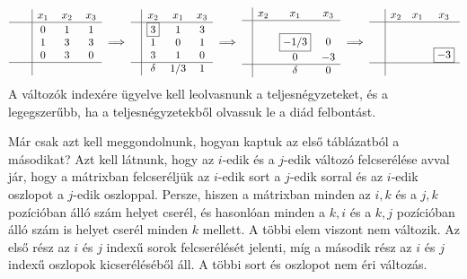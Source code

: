 \documentclass[a4paper, showtrims]{memoir}
\theoremstyle{plain}
\theoremstyle{remark}
\theoremstyle{definition}
\begin{document}
\[
\begin{array}{c|ccc}
     & x_1       & x_2 & x_3 \\
     \hline
     \phantom{\boxed{3}} & 0 & 1   & 1   \\
     & 1 & 3   & 3   \\
     & 0 & 3   & 0   \\
    \hline
    & \phantom{\delta}     &\phantom{1/3}    &\phantom{1}
\end{array}
\implies
\begin{array}{c|ccc}
     & x_2       & x_1 & x_3 \\
     \hline
     & \boxed{3} & 1   & 3   \\
     & 1         & 0   & 1   \\
     & 3         & 1   & 0   \\
    \hline
    & \delta     & 1/3   & 1 
\end{array}
\implies
\begin{array}{c|ccc}
     & x_2& x_1  & x_3 \\
     \hline
     & &                &     \\
     & & \boxed{-1/3}      & 0   \\
     & & 0              & -3   \\
     \hline
     & & \delta         & 0
\end{array}
\implies
\begin{array}{c|ccc}
     & x_2 & x_1 & x_3      \\
     \hline
     &     &     &          \\
     &     &     &          \\
     &     &     & \boxed{-3}\\
    \hline
    \phantom{\delta}
\end{array}
\]
A változók indexére ügyelve kell leolvasnunk a teljesnégyzeteket, és a legegszerűbb, ha a teljesnégyzetekből olvassuk le a diád felbontást.

Már csak azt kell meggondolnunk, hogyan kaptuk az első táblázatból a másodikat?
Azt kell látnunk, hogy az $i$-edik és a $j$-edik változó felcserélése avval jár, 
hogy a mátrixban felcseréljük az $i$-edik sort a $j$-edik sorral és az $i$-edik oszlopot a $j$-edik oszloppal.
Persze, hiszen a mátrixban minden az $i,k$ és a $j,k$ pozícióban álló szám helyet cserél, 
és hasonlóan minden a $k,i$ és a $k,j$ pozícióban álló szám is helyet cserél minden $k$ mellett.
A többi elem viszont nem változik.
Az első rész az $i$ és $j$ indexű sorok felcserélését jelenti, míg a második rész az $i$ és $j$ indexű oszlopok kicseréléséből áll.
A többi sort és oszlopot nem éri változás.
\end{document}
